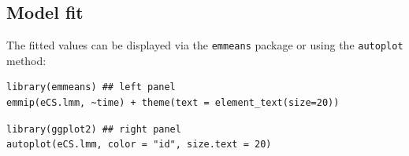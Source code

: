 \documentclass[12pt]{article}
\begin{document}
\subsection{Model fit}
\label{sec:orge045a75}

The fitted values can be displayed via the \texttt{emmeans} package or using the \texttt{autoplot} method:
\lstset{language=r,label= ,caption= ,captionpos=b,numbers=none}
\begin{lstlisting}
library(emmeans) ## left panel
emmip(eCS.lmm, ~time) + theme(text = element_text(size=20))
\end{lstlisting}

\lstset{language=r,label= ,caption= ,captionpos=b,numbers=none}
\begin{lstlisting}
library(ggplot2) ## right panel
autoplot(eCS.lmm, color = "id", size.text = 20)
\end{lstlisting}
\end{document}
